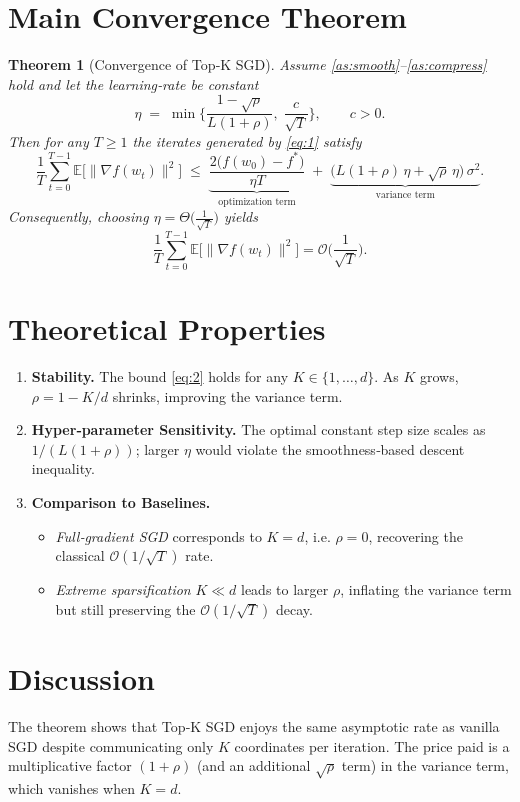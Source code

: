 \documentclass{article}
\newtheorem{theorem}{Theorem}
\begin{document}
\section*{Main Convergence Theorem}
\begin{theorem}[Convergence of Top‑K SGD]\label{thm:main}
Assume \ref{as:smooth}–\ref{as:compress} hold and let the learning‑rate be constant
\[
\eta\;=\;\min\Big\{\frac{1-\sqrt{\rho}}{L(1+\rho)},\;\frac{c}{\sqrt{T}}\Big\},
\qquad c>0.
\]
Then for any $T\ge 1$ the iterates generated by \eqref{eq:1} satisfy
\[
\frac{1}{T}\sum_{t=0}^{T-1}\mathbb{E}\big[\|\nabla f(w_t)\|^{2}\big]
\;\le\;
\underbrace{\frac{2\big(f(w_0)-f^{*}\big)}{\eta T}}_{\text{optimization term}}
\;+\;
\underbrace{\big(L(1+\rho)\,\eta+\sqrt{\rho}\,\eta\big)\,\sigma^{2}}_{\text{variance term}}.
\tag{2}
\]
Consequently, choosing $\eta = \Theta\!\big(\frac{1}{\sqrt{T}}\big)$ yields
\[
\frac{1}{T}\sum_{t=0}^{T-1}\mathbb{E}\big[\|\nabla f(w_t)\|^{2}\big]=\mathcal{O}\!\Big(\frac{1}{\sqrt{T}}\Big).
\]
\end{theorem}

\section*{Theoretical Properties}
\begin{enumerate}[label=\arabic*.]
\item \textbf{Stability.} The bound \eqref{eq:2} holds for any $K\in\{1,\dots,d\}$.  As $K$ grows, $\rho=1-K/d$ shrinks, improving the variance term.
\item \textbf{Hyper‑parameter Sensitivity.} The optimal constant step size scales as $1/(L(1+\rho))$; larger $\eta$ would violate the smoothness‑based descent inequality.
\item \textbf{Comparison to Baselines.}
    \begin{itemize}
        \item \emph{Full‑gradient SGD} corresponds to $K=d$, i.e. $\rho=0$, recovering the classical $\mathcal{O}(1/\sqrt{T})$ rate.
        \item \emph{Extreme sparsification} $K\ll d$ leads to larger $\rho$, inflating the variance term but still preserving the $\mathcal{O}(1/\sqrt{T})$ decay.
    \end{itemize}
\end{enumerate}

\section*{Discussion}
The theorem shows that Top‑K SGD enjoys the same asymptotic rate as vanilla SGD despite communicating only $K$ coordinates per iteration.  The price paid is a multiplicative factor $(1+\rho)$ (and an additional $\sqrt{\rho}$ term) in the variance term, which vanishes when $K=d$.
\end{document}
